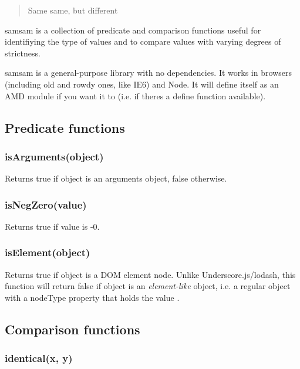 \begin{quote}
Same same, but different \end{quote}


{\ttfamily samsam} is a collection of predicate and comparison functions useful for identifiying the type of values and to compare values with varying degrees of strictness.

{\ttfamily samsam} is a general-\/purpose library with no dependencies. It works in browsers (including old and rowdy ones, like I\+E6) and Node. It will define itself as an A\+MD module if you want it to (i.\+e. if there\textquotesingle{}s a {\ttfamily define} function available).

\subsection*{Predicate functions}

\subsubsection*{{\ttfamily is\+Arguments(object)}}

Returns {\ttfamily true} if {\ttfamily object} is an {\ttfamily arguments} object, {\ttfamily false} otherwise.

\subsubsection*{{\ttfamily is\+Neg\+Zero(value)}}

Returns {\ttfamily true} if {\ttfamily value} is {\ttfamily -\/0}.

\subsubsection*{{\ttfamily is\+Element(object)}}

Returns {\ttfamily true} if {\ttfamily object} is a D\+OM element node. Unlike Underscore.\+js/lodash, this function will return {\ttfamily false} if {\ttfamily object} is an {\itshape element-\/like} object, i.\+e. a regular object with a {\ttfamily node\+Type} property that holds the value {}.

\subsection*{Comparison functions}

\subsubsection*{{\ttfamily identical(x, y)}}

